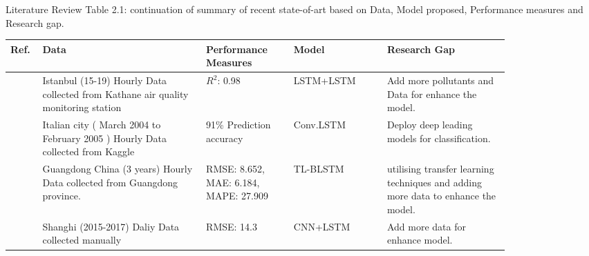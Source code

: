 \documentclass[12pt, aspectratio=169]{beamer}
\begin{document}
\begin{frame}{Literature Review}
	\centering
	\scriptsize {Table 2.1: continuation of summary of recent state-of-art based on Data,  Model proposed,  Performance measures and Research gap.}\\
	\begin{table}
		\centering
		\begin{tabular}{|p{0.03\linewidth}|p{0.29\linewidth}|p{0.15\linewidth}|p{0.16\linewidth}|p{0.21\linewidth}|}
			\hline
			\footnotesize \textbf {Ref.} & \footnotesize \textbf { Data} & \footnotesize \textbf {Performance Measures } & \footnotesize \textbf {Model} & \footnotesize \textbf {Research Gap }  \\ \hline
			\scriptsize  \cite{eren2023predicting}         \scriptsize & Istanbul (15-19) Hourly Data collected from Kathane air quality monitoring station                     \scriptsize & $R^2$:  0.98                                                                                               \scriptsize & LSTM+LSTM                                                           \scriptsize & Add more pollutants and Data for enhance the model.           \\\hline
			\scriptsize \cite{zhu2023deep}           \scriptsize & Italian city ( March 2004 to   February 2005 ) Hourly Data collected from Kaggle \scriptsize & 91\% Prediction accuracy \scriptsize & Conv.LSTM                                                           \scriptsize & Deploy deep leading models for classification.  \\\hline
			\scriptsize \cite{ma2019improving}               \scriptsize & Guangdong China (3 years) Hourly   Data collected from Guangdong province.                               \scriptsize & RMSE: 8.652,  MAE: 6.184,    MAPE: 27.909                                                                   \scriptsize & TL-BLSTM                                                            \scriptsize & utilising transfer learning techniques and adding more data to enhance the model.     \\\hline
			\scriptsize \cite{qin2019novel}       \scriptsize & Shanghi (2015-2017) Daliy Data collected   manually  \scriptsize & RMSE:  14.3   \scriptsize & CNN+LSTM     \scriptsize &  Add more data for enhance model. \\\hline
			\end{tabular}
	\end{table}
\end{frame}
\end{document}
